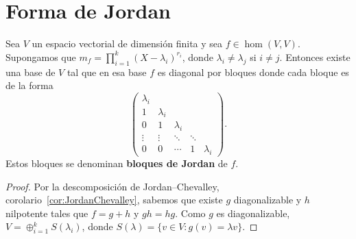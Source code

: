 

\section{Forma de Jordan}

\begin{thm}
    Sea $V$ un espacio vectorial de dimensión finita y sea $f\in\hom(V,V)$.
    Supongamos que $m_f=\prod_{i=1}^k(X-\lambda_i)^{r_i}$, donde
    $\lambda_i\ne\lambda_j$ si $i\ne j$. Entonces existe una base de $V$ tal que
    en esa base $f$ es diagonal por bloques donde cada bloque es 
    de la forma
    \[
        \begin{pmatrix}
            \lambda_i\\
            1 & \lambda_i\\
            0 & 1 & \lambda_i\\
            \vdots & \vdots & \ddots & \ddots\\
            0&0&\cdots&1&\lambda_i
        \end{pmatrix}.
    \]
    Estos bloques se denominan \textbf{bloques de Jordan} de $f$.

    \begin{proof}
        Por la descomposición de Jordan--Chevalley,
        corolario~\ref{cor:JordanChevalley}, sabemos que existe $g$
        diagonalizable y $h$ nilpotente tales que $f=g+h$ y $gh=hg$. Como $g$
        es diagonalizable, $V=\oplus_{i=1}^kS(\lambda_i)$, donde
        $S(\lambda)=\{v\in V:g(v)=\lambda v\}$.


\end{proof}
\end{thm}
